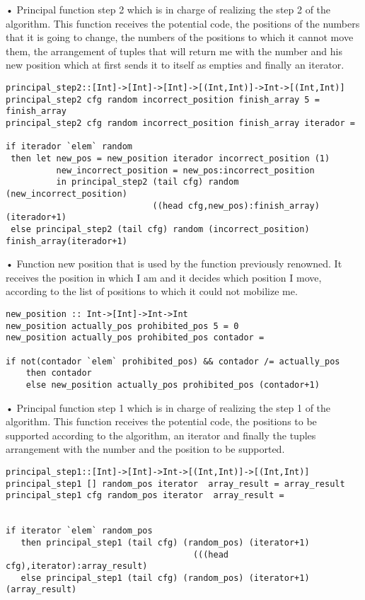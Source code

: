 \documentclass[12pt,letterpaper]{article}
\begin{document}
\begin{raggedleft}
• Principal function step 2 which is in charge of realizing the step 2 of the algorithm. This function receives the potential code, the positions of the numbers that it is going to change, the numbers of the positions to which it cannot move them, the arrangement of tuples that will return me with the number and his new position which at first sends it to itself as empties and finally an iterator. 
\end{raggedleft}
\begin{verbatim}
principal_step2::[Int]->[Int]->[Int]->[(Int,Int)]->Int->[(Int,Int)]
principal_step2 cfg random incorrect_position finish_array 5 = finish_array 
principal_step2 cfg random incorrect_position finish_array iterador = 

if iterador `elem` random 
 then let new_pos = new_position iterador incorrect_position (1)
          new_incorrect_position = new_pos:incorrect_position
          in principal_step2 (tail cfg) random (new_incorrect_position)
                             ((head cfg,new_pos):finish_array)(iterador+1)
 else principal_step2 (tail cfg) random (incorrect_position) finish_array(iterador+1)
\end{verbatim}

\begin{raggedleft}
• Function new position that is used by the function previously renowned. It receives the position in which I am and it decides which position I move, according to the list of positions to which it could not mobilize me.
\end{raggedleft}
\begin{verbatim}
new_position :: Int->[Int]->Int->Int
new_position actually_pos prohibited_pos 5 = 0
new_position actually_pos prohibited_pos contador =

if not(contador `elem` prohibited_pos) && contador /= actually_pos
    then contador
    else new_position actually_pos prohibited_pos (contador+1)
\end{verbatim}

\begin{raggedleft}
• Principal function step 1 which is in charge of realizing the step 1 of the algorithm. This function receives the potential code, the positions to be supported according to the algorithm, an iterator and finally the tuples arrangement with the number and the position to be supported.
\end{raggedleft}
\begin{verbatim}
principal_step1::[Int]->[Int]->Int->[(Int,Int)]->[(Int,Int)]
principal_step1 [] random_pos iterator  array_result = array_result
principal_step1 cfg random_pos iterator  array_result = 


if iterator `elem` random_pos
   then principal_step1 (tail cfg) (random_pos) (iterator+1)  
                                     (((head cfg),iterator):array_result)
   else principal_step1 (tail cfg) (random_pos) (iterator+1)  (array_result)
\end{verbatim}
\end{document}
